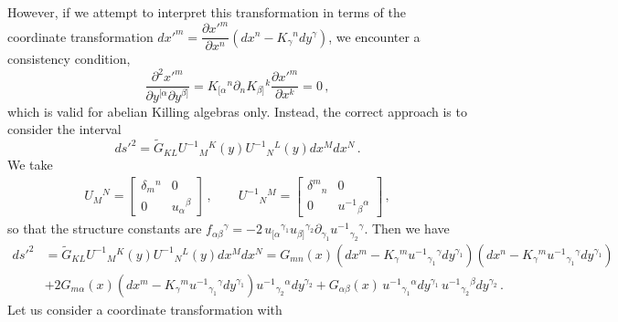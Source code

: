 \documentclass[12pt, utf8]{article}
\numberwithin{equation}{section}
\begin{document}
However, if we attempt to interpret this transformation in terms of the coordinate transformation
 $dx'^{m} = \dfrac{\partial{x'^{m}}}{\partial x^{n}}(dx^{n} - K_{\gamma}{}^{n}dy^{\gamma}) $, 
we encounter a consistency condition,
\begin{equation}
    \dfrac{\partial^2 x'^m}{\partial y^{[\alpha} \partial y^{\beta]}} = K_{[\alpha}{}^{n} \partial_{n} K_{\beta]}{}^{k} \dfrac{\partial x'^m}{\partial x^k} = 0 \, , 
\end{equation}
which is valid for abelian Killing algebras only. Instead, the correct approach is to consider the interval
\begin{equation}
    ds'^2 = \tilde{G}_{K L} U^{-1}{}_{M}{}^{K}(y) U^{-1 }{}_{N}{}^{L}(y) dx^{M} dx^{N} \, .
\end{equation}
We take 
\begin{equation}
    \begin{aligned}
  U_{M}{}^{N} = 
  \begin{bmatrix}
		    \delta_{m}{}^{n} & 0 \\
          0 & u_{\alpha}{}^{\beta}
	     \end{bmatrix}  \, , \qquad  U^{-1 }{}_{N}{}^{M} = 
  \begin{bmatrix}
		    \delta^{m}{}_{n} & 0 \\
          0 & u^{-1 }{}_{\beta}{}^{\alpha} 
	     \end{bmatrix} \, , 
    \end{aligned}
\end{equation}
so that the structure constants  are $f_{\alpha \beta}{}^{\gamma} = -2 \,u_{[\alpha}{}^{\gamma_1} u_{\beta]}{}^{\gamma_2} \partial_{\gamma_1} u^{-1}{}_{\gamma_2}{}^{\gamma}$. Then we have 
\begin{equation} \label{interval_deformation}
 \begin{aligned}
        ds'^2 & = \tilde{G}_{K L} U^{-1}{}_{M}{}^{K}(y) U^{-1}{}_{N}{}^{L}(y) dx^{M} dx^{N}  = G_{m n}(x) (dx^{m} - K_{\gamma}{}^{m} u^{-1}{}_{\gamma_1}{}^{\gamma} dy^{\gamma_1} ) (dx^{n} - K_{\gamma}{}^{m} u^{-1}{}_{\gamma_1}{}^{\gamma} dy^{\gamma_1} ) \\
        &+ 2 G_{m \alpha}(x)  (dx^{m} - K_{\gamma}{}^{m} u^{-1}{}_{\gamma_1}{}^{\gamma} dy^{\gamma_1} ) u^{-1}{}_{\gamma_2}{}^{\alpha} dy^{\gamma_2} + G_{\alpha \beta}(x) \,u^{-1}{}_{\gamma_1}{}^{\alpha} dy^{\gamma_1} \, u^{-1}{}_{\gamma_2}{}^{\beta} dy^{\gamma_2} \, .
 \end{aligned}
 \end{equation}
Let us consider a coordinate transformation with 
\end{document}
